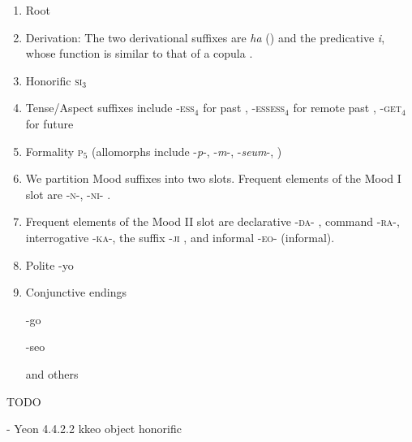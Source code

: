 \documentclass[11pt,letterpaper]{article}
\begin{document}
\begin{enumerate}
    \item Root
    \item Derivation: The two derivational suffixes are \textit{ha} (\citep[4.1.2]{yeon2010korean}) and the predicative \textit{i}, whose function is similar to that of a copula \citep[4.1.4]{yeon2010korean}.
    
    \item Honorific \textsc{si}$_3$ \citep[4.3.2, 4.4.1]{yeon2010korean}
    \item Tense/Aspect suffixes include -\textsc{ess}$_4$ for past \citep[4.5.1.1]{yeon2010korean}, -\textsc{essess}$_4$ for remote past \citep[4.5.1.2]{yeon2010korean}, -\textsc{get}$_4$ for future \citep[4.5.2.1]{yeon2010korean}
    \item Formality \textsc{p}$_5$ (allomorphs include -\textit{p}-, -\textit{m}-, -\textit{seum}-,  \citep[4.3.2]{yeon2010korean})
    \item We partition Mood suffixes into two slots. Frequent elements of the Mood I slot are -\textsc{n}-, -\textsc{ni}- \citep[4.3.2]{yeon2010korean}.
    
    \item Frequent elements of the Mood II slot are declarative -\textsc{da}- \citep[4.3.2]{yeon2010korean}, command -\textsc{ra}-, interrogative -\textsc{ka}-, the suffix  -\textsc{ji} \citep[4.2.2-3]{yeon2010korean}, and informal -\textsc{eo}- (informal).
    
    \item Polite -yo
    \item Conjunctive endings
    
    -go
    
    -seo
    
    and others
    
\end{enumerate}

TODO 

- Yeon 4.4.2.2 kkeo object honorific %

\end{document}
